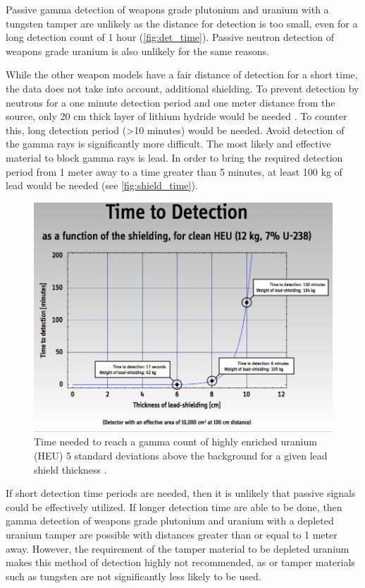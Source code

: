 \documentclass{report}
\begin{document}
Passive gamma detection of weapons grade plutonium and uranium with a tungsten tamper are unlikely as the distance for detection is too small, even for a long detection count of 1 hour (\autoref{fig:det_time}). Passive neutron detection of weapons grade uranium is also unlikely for the same reasons. 


While the other weapon models have a fair distance of detection for a short time, the data does not take into account, additional shielding. To prevent detection by neutrons for a one minute detection period and one meter distance from the source, only 20 cm thick layer of lithium hydride would be needed \cite{Fetter1990}. To counter this, long detection period (\textgreater 10 minutes) \cite{Fetter1990} would be needed. Avoid detection of the gamma rays is significantly more difficult. The most likely and effective material to block gamma rays is lead. In order to bring the required detection period from 1 meter away to a time greater than 5 minutes, at least 100 kg of lead would be needed (see \autoref{fig:shield_time}).


\begin{figure}[H]
 \centering
 \includegraphics[trim = 0cm 0.1cm 0cm 0cm, clip,scale=0.4]{./figures/shield_time.png}
   \caption{Time needed to reach a gamma count of highly enriched uranium (HEU) 5 standard deviations above the background for a given lead shield thickness \cite{Glaser2007}.}
     \label{fig:shield_time}
\end{figure}



If short detection time periods are needed, then it is unlikely that passive signals could be effectively utilized. If longer detection time are able to be done, then gamma detection of weapons grade plutonium and uranium with a depleted uranium tamper are possible with distances greater than or equal to 1 meter away. However, the requirement of the tamper material to be depleted uranium makes this method of detection highly not recommended, as or tamper materials such as tungsten are not significantly less likely to be used. 
\end{document}
